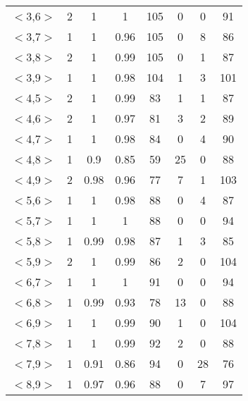 \documentclass[11pt,letterpaper,oneside]{article}
\begin{document}
\begin{table}[th]
\begin{tabular*}{\textwidth}{@{\extracolsep{\fill}}cccccccc}
$<$3,6$>$ & 2 & 1 & 1 & 105 & 0 & 0 & 91\\
$<$3,7$>$ & 1 & 1 & 0.96 & 105 & 0 & 8 & 86\\
$<$3,8$>$ & 2 & 1 & 0.99 & 105 & 0 & 1 & 87\\
$<$3,9$>$ & 1 & 1 & 0.98 & 104 & 1 & 3 & 101\\
$<$4,5$>$ & 2 & 1 & 0.99 & 83 & 1 & 1 & 87\\
$<$4,6$>$ & 2 & 1 & 0.97 & 81 & 3 & 2 & 89\\
$<$4,7$>$ & 1 & 1 & 0.98 & 84 & 0 & 4 & 90\\
$<$4,8$>$ & 1 & 0.9 & 0.85 & 59 & 25 & 0 & 88\\
$<$4,9$>$ & 2 & 0.98 & 0.96 & 77 & 7 & 1 & 103\\
$<$5,6$>$ & 1 & 1 & 0.98 & 88 & 0 & 4 & 87\\
$<$5,7$>$ & 1 & 1 & 1 & 88 & 0 & 0 & 94\\
$<$5,8$>$ & 1 & 0.99 & 0.98 & 87 & 1 & 3 & 85\\
$<$5,9$>$ & 2 & 1 & 0.99 & 86 & 2 & 0 & 104\\
$<$6,7$>$ & 1 & 1 & 1 & 91 & 0 & 0 & 94\\
$<$6,8$>$ & 1 & 0.99 & 0.93 & 78 & 13 & 0 & 88\\
$<$6,9$>$ & 1 & 1 & 0.99 & 90 & 1 & 0 & 104\\
$<$7,8$>$ & 1 & 1 & 0.99 & 92 & 2 & 0 & 88\\
$<$7,9$>$ & 1 & 0.91 & 0.86 & 94 & 0 & 28 & 76\\
$<$8,9$>$ & 1 & 0.97 & 0.96 & 88 & 0 & 7 & 97\\
\hline
\end{tabular*}
\label{tab3}
\end{table}
\end{document}
